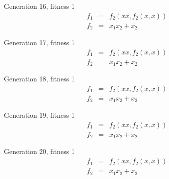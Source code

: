 Generation 16, fitness 1
\begin{eqnarray}
f_1 & = & f_2(x x,f_2(x,x))\nonumber \\
f_2 & = & x_1 x_2+x_2\nonumber 
\end{eqnarray}

Generation 17, fitness 1
\begin{eqnarray}
f_1 & = & f_2(x x,f_2(x,x))\nonumber \\
f_2 & = & x_1 x_2+x_2\nonumber 
\end{eqnarray}

Generation 18, fitness 1
\begin{eqnarray}
f_1 & = & f_2(x x,f_2(x,x))\nonumber \\
f_2 & = & x_1 x_2+x_2\nonumber 
\end{eqnarray}

Generation 19, fitness 1
\begin{eqnarray}
f_1 & = & f_2(x x,f_2(x,x))\nonumber \\
f_2 & = & x_1 x_2+x_2\nonumber 
\end{eqnarray}

Generation 20, fitness 1
\begin{eqnarray}
f_1 & = & f_2(x x,f_2(x,x))\nonumber \\
f_2 & = & x_1 x_2+x_2\nonumber 
\end{eqnarray}




